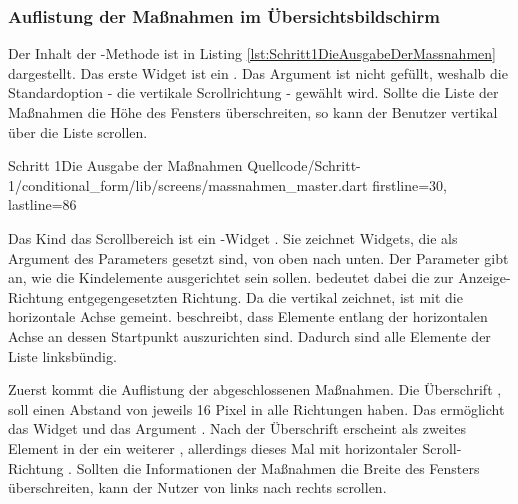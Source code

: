 \subsubsection{Auflistung der Maßnahmen im Übersichtsbildschirm}

Der Inhalt der -Methode ist in Listing \ref{lst:Schritt1DieAusgabeDerMassnahmen} dargestellt.
Das erste Widget ist ein  .
Das Argument  ist nicht gefüllt, weshalb die Standardoption - die vertikale Scrollrichtung - gewählt wird.
Sollte die Liste der Maßnahmen die Höhe des Fensters überschreiten, so kann der Benutzer vertikal über die Liste scrollen.

\begin{alexlisting}{Schritt 1}{Die Ausgabe der Maßnahmen}
  {Quellcode/Schritt-1/conditional_form/lib/screens/massnahmen_master.dart}
  {firstline=30, lastline=86}
  \label{lst:Schritt1DieAusgabeDerMassnahmen}
\end{alexlisting}

Das Kind das Scrollbereich ist ein -Widget .
Sie zeichnet Widgets, die als Argument des Parameters  gesetzt sind, von oben nach unten.
Der Parameter  gibt an, wie die Kindelemente ausgerichtet sein sollen.  bedeutet dabei die zur Anzeige-Richtung entgegengesetzten Richtung. Da die  vertikal zeichnet, ist mit  die horizontale Achse gemeint.  beschreibt, dass Elemente entlang der horizontalen Achse an dessen Startpunkt auszurichten sind. Dadurch sind alle Elemente der Liste linksbündig.

Zuerst kommt die Auflistung der abgeschlossenen Maßnahmen.
Die Überschrift  , soll einen Abstand von jeweils 16 Pixel in alle Richtungen haben.
Das ermöglicht das Widget   und das Argument . Nach der Überschrift erscheint als zweites Element in der  ein weiterer  , allerdings dieses Mal mit horizontaler Scroll-Richtung . Sollten die Informationen der Maßnahmen die Breite des Fensters überschreiten, kann der Nutzer von links nach rechts scrollen.

